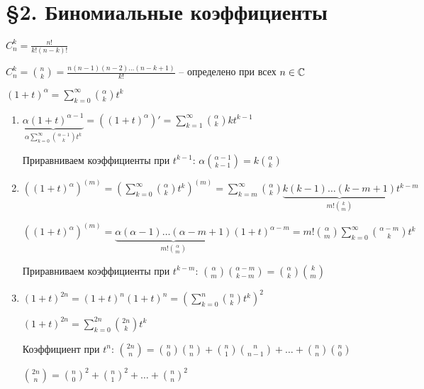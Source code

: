 \documentclass[12pt]{article}
\begin{document}
\newpage

\section{\S 2. Биномиальные коэффициенты}

\begin{Reminder}{}
    $C_n^k = \frac{n!}{k!(n - k)!}$

    $C_n^k = {n \choose k} = \frac{n(n - 1)(n - 2) \ldots (n - k + 1)}{k!}$ -- определено при всех $n \in \mathbb C$

    $(1 + t)^\alpha = \sum\limits_{k = 0}^\infty {\alpha \choose k} t^k$
\end{Reminder}

\begin{Example}{}
    \begin{enumerate}
        \item $\underbrace{\alpha(1 + t)^{\alpha - 1}}_{\alpha\sum\limits_{k = 0}^\infty {\alpha - 1 \choose k} t^k} = ((1 + t)^\alpha)' = \sum\limits_{k = 1}^\infty {\alpha \choose k}kt^{k - 1}$
        
        Приравниваем коэффициенты при $t^{k - 1}$: $\alpha{\alpha - 1 \choose k - 1} = k {\alpha \choose k}$

        \item $((1 + t)^\alpha)^{(m)} = (\sum\limits_{k = 0}^\infty {\alpha \choose k}t^k)^{(m)} = \sum\limits_{k = m}^\infty {\alpha \choose k} \underbrace{k(k - 1) \ldots (k - m + 1)}_{m!{k \choose m}}t^{k - m}$
        
        $((1 + t)^\alpha)^{(m)} = \underbrace{\alpha(\alpha - 1)\ldots(\alpha - m + 1)}_{m! {\alpha \choose m}}(1 + t)^{\alpha - m} = m! {\alpha \choose m} \sum\limits_{k = 0}^\infty {\alpha - m \choose k} t^k$

        Приравниваем коэффициенты при $t^{k - m}$: ${\alpha \choose m}{\alpha - m \choose k - m} = {\alpha \choose k}{k \choose m}$

        \item $(1 + t)^{2n} = (1 + t)^n(1 + t)^n = (\sum\limits_{k = 0}^n {n \choose k}t^k)^2$
        
        $(1 + t)^{2n} = \sum\limits_{k = 0}^{2n} {2n \choose k}t^k$

        Коэффициент при $t^n$: ${2n \choose n} = {n \choose 0}{n \choose n} + {n \choose 1}{n \choose n - 1} + \ldots + {n \choose n}{n \choose 0}$

        ${2n \choose n} = {n \choose 0}^2 + {n \choose 1}^2 + \ldots + {n \choose n}^2$


\end{enumerate}
\end{Example}
\end{document}

